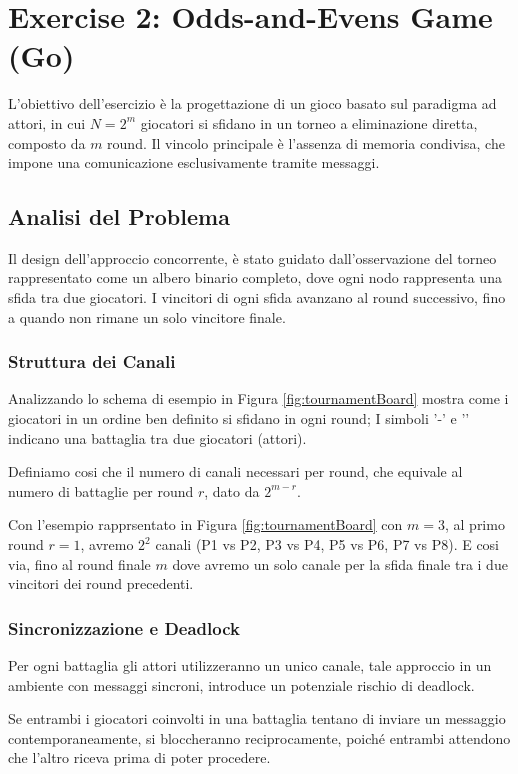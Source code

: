 \section{Exercise 2: Odds-and-Evens Game (Go)}
L'obiettivo dell'esercizio è la progettazione di un gioco basato sul paradigma ad attori, in cui $N = 2^m$ giocatori si sfidano in un torneo a eliminazione diretta, composto da $m$ round.
Il vincolo principale è l'assenza di memoria condivisa, che impone una comunicazione esclusivamente tramite messaggi.

\subsection{Analisi del Problema}
Il design dell'approccio concorrente, è stato guidato dall'osservazione del torneo rappresentato come un albero binario completo, dove ogni nodo rappresenta una sfida tra due giocatori. I vincitori di ogni sfida avanzano al round successivo, fino a quando non rimane un solo vincitore finale.


\subsubsection{Struttura dei Canali}
Analizzando lo schema di esempio in Figura \ref{fig:tournamentBoard} mostra come i giocatori in un ordine ben definito si sfidano in ogni round; I simboli $\text{'-'}$ e '\textbar' indicano una battaglia tra due giocatori (attori).

Definiamo cosi che il numero di canali necessari per round, che equivale al numero di battaglie per round $r$, dato da $2^{m-r}$. 

Con l'esempio rapprsentato in Figura \ref{fig:tournamentBoard} con $m=3$, al primo round $r=1$, avremo $2^{2}$ canali (P1 vs P2, P3 vs P4, P5 vs P6, P7 vs P8).
E cosi via, fino al round finale $m$ dove avremo un solo canale per la sfida finale tra i due vincitori dei round precedenti.

\subsubsection{Sincronizzazione e Deadlock}
Per ogni battaglia gli attori utilizzeranno un unico canale, tale approccio in un ambiente con messaggi sincroni, introduce un potenziale rischio di deadlock.

Se entrambi i giocatori coinvolti in una battaglia tentano di inviare un messaggio contemporaneamente, si bloccheranno reciprocamente, poiché entrambi attendono che l'altro riceva prima di poter procedere.

